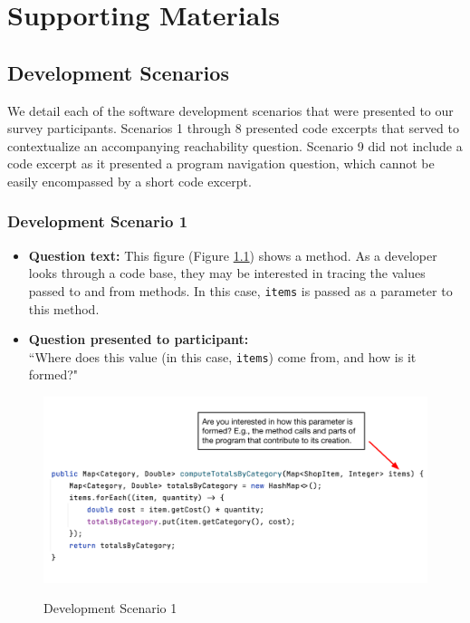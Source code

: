 \chapter{Supporting Materials}

\section{Development Scenarios}
\label{sec:DevelopmentScenario}

We detail each of the software development scenarios that were presented to our
survey participants.
Scenarios 1 through 8 presented code excerpts that served to contextualize
an accompanying reachability question.
Scenario 9 did not include a code excerpt as it presented a program navigation
question, which cannot be easily encompassed by a short code excerpt.

\subsection{Development Scenario 1}

\begin{itemize}
  \item[] \textbf{Question text:} This figure (Figure \ref{fig:DS1}) shows a 
          method.
          As a developer looks through a code base, they may be interested in 
          tracing the  values passed to and from methods.
          In this case, \texttt{items} is passed as a parameter to this method.
  \item[] \textbf{Question presented to participant:}  \\
          ``Where does this value 
          (in this case, \texttt{items}) come from, and how is it formed?"
\end{itemize}

\begin{figure}[ht]
\centering
\caption{Development Scenario 1}
\includegraphics[width=\textwidth]{./figs/ds1.png}
\label{fig:DS1}
\end{figure}

